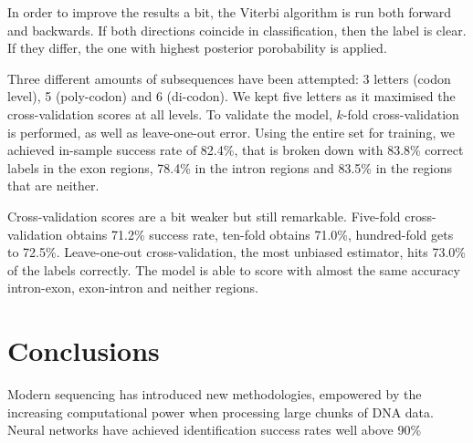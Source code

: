 \documentclass[a4paper, 11pt]{article} %
\begin{document}
In order to improve the results a bit, the Viterbi algorithm is run both forward and backwards. If both directions coincide in classification, then the label is clear. If they differ, the one with highest posterior porobability is applied.

Three different amounts of subsequences have been attempted: 3 letters (codon level), 5 (poly-codon) and 6 (di-codon). We kept five letters as it maximised the cross-validation scores at all levels. To validate the model, $k$-fold cross-validation is performed, as well as leave-one-out error. Using the entire set for training, we achieved in-sample success rate of 82.4\%, that is broken down with 83.8\% correct labels in the exon regions, 78.4\% in the intron regions and 83.5\% in the regions that are neither.

Cross-validation scores are a bit weaker but still remarkable. Five-fold cross-validation obtains 71.2\% success rate, ten-fold obtains 71.0\%, hundred-fold gets to 72.5\%. Leave-one-out cross-validation, the most unbiased estimator, hits 73.0\% of the labels correctly. The model is able to score with almost the same accuracy intron-exon, exon-intron and neither regions.



\section*{Conclusions}

Modern sequencing has introduced new methodologies, empowered by the increasing computational power when processing large chunks of DNA data. Neural networks have achieved identification success rates well above 90\%


\medskip

\end{document}
